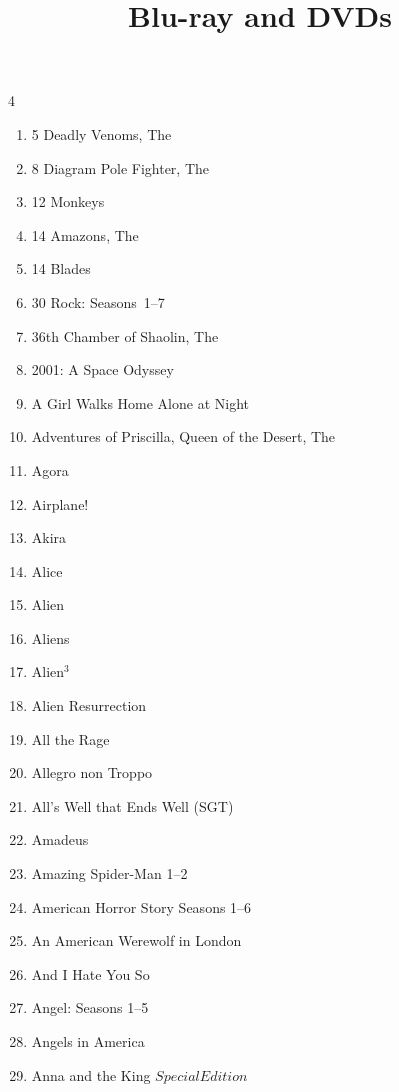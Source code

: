 \documentclass{article}
\newif\ifsmall
\begin{document}

\ifsmall
    \fontsize{7pt}{8pt}
\fi

\selectfont

\title{Blu-ray and DVDs}

\maketitle

\begin{multicols}{4}

\begin{enumerate}
\itemsep0pt
\parskip0pt

\item 5 Deadly Venoms, The
\item 8 Diagram Pole Fighter, The
\item 12 Monkeys
\item 14 Amazons, The
\item 14 Blades
\item 30 Rock: Seasons~1--7
\item 36th Chamber of Shaolin, The
\item 2001: A Space Odyssey
\item A Girl Walks Home Alone at Night
\item Adventures of Priscilla, Queen of the Desert, The
\item Agora
\item Airplane!
\item Akira
\item Alice
\item Alien
\item Aliens
\item Alien$^3$
\item Alien Resurrection
\item All the Rage
\item Allegro non Troppo
\item All's Well that Ends Well (SGT)
\item Amadeus
\item Amazing Spider-Man 1--2
\item American Horror Story Seasons 1--6
\item An American Werewolf in London
\item And I Hate You So
\item Angel: Seasons 1--5
\item Angels in America
\item Anna and the King \(Special Edition\)

\end{enumerate}
\end{multicols}
\end{document}

